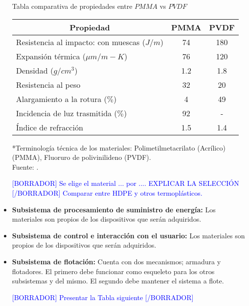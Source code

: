 \begin{itemize}
	\begin{mytable}[H]
		\centering
		\caption{Tabla comparativa de propiedades entre $PMMA$ vs $PVDF$}
		\label{tab:tabla comparativa de propiedades entre pmma vs pvdf}
		\begin{tabular}{|l|c|c|}
			\hline
			\multicolumn{1}{|c|}{\textbf{Propiedad}} & \multicolumn{1}{c|}{\textbf{PMMA}} & \textbf{PVDF} \\ \hline
			Resistencia al impacto: con muescas ($J/m$) & 74     & 180   \\ \hline
			Expansión térmica (${\mu}m/m-K$)  & 76 & 120 \\ \hline
			Densidad ($g/cm^3$) & 1.2 & 1.8  \\ \hline
			Resistencia al peso  & 32 & 20 \\ \hline
			Alargamiento a la rotura ($ \% $) & 4 & 49 \\ \hline
			Incidencia de luz trasmitida ($ \% $) & 92 & - \\ \hline
			Índice de refracción & 1.5 & 1.4 \\ \hline			
		\end{tabular}
		\begin{flushleft}
			*Terminología técnica de los materiales: Polimetilmetacrilato (Acrílico)(PMMA), Fluoruro de polivinilideno (PVDF).\\		
			Fuente: \cite{Brydson1999,Berins1991,Harper2000,MakeItFrom2020}.
		\end{flushleft}
	\end{mytable}

	\textcolor{blue}{[BORRADOR] Se elige el material ... por .... EXPLICAR LA SELECCIÓN [/BORRADOR] Comparar entre HDPE y otros termoplásticos.} 
	
	\item \textbf{Subsistema de procesamiento de suministro de energía:} Los materiales son propios de los dispositivos que serán adquiridos.
	
	\item \textbf{Subsistema de control e interacción con el usuario:} Los materiales son propios de los dispositivos que serán adquiridos.
	
	\item \textbf{Subsistema de flotación:} Cuenta con dos mecanismos; armadura y flotadores. El primero debe funcionar como esqueleto para los otros subsistemas y del mismo. El segundo debe mantener el sistema a flote.
	
	\textcolor{blue}{[BORRADOR] Presentar la Tabla siguiente [/BORRADOR]} 
	

\end{itemize}
